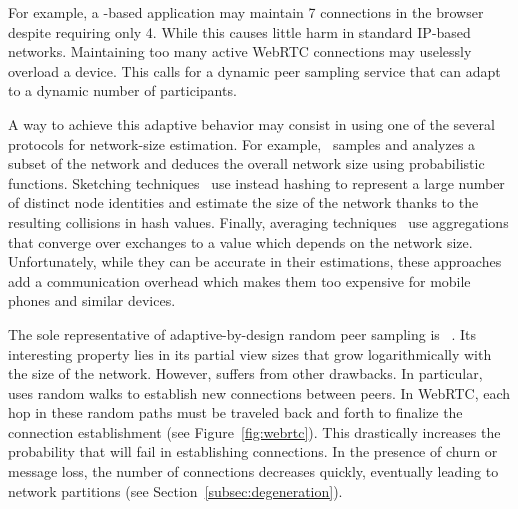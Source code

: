 For example, a \CYCLON-based application may maintain 7 connections in
the browser despite requiring only 4. While this causes little harm in
standard IP-based networks. Maintaining too many active WebRTC
connections may uselessly overload a device. This calls for a dynamic
peer sampling service that can adapt to a dynamic number of
participants.

A way to achieve this adaptive behavior may consist in using one of the several
protocols for network-size estimation. For example,~\cite{ganesh2007peer}
samples and analyzes a subset of the network and deduces the overall network
size using probabilistic functions.  Sketching
techniques~\cite{baquero2012extrema} use instead hashing to represent a large
number of distinct node identities and estimate the size of the network thanks
to the resulting collisions in hash values. Finally, averaging
techniques~\cite{jelasity2004epidemic} use aggregations that converge over
exchanges to a value which depends on the network size. Unfortunately, while
they can be accurate in their estimations, these approaches add a communication
overhead which makes them too expensive for mobile phones and similar devices.



The sole representative of adaptive-by-design random peer sampling is
\SCAMP~\cite{ganesh2001, ganesh2003peer}. Its interesting property lies in its
partial view sizes that grow logarithmically with the size of the
network. However, \SCAMP suffers from other drawbacks.  In particular, \SCAMP
uses random walks to establish new connections between peers. In WebRTC, each
hop in these random paths must be traveled back and forth to finalize the
connection establishment (see Figure~\ref{fig:webrtc}). This drastically
increases the probability that \SCAMP will fail in establishing connections. In
the presence of churn or message loss, the number of connections decreases
quickly, eventually leading to network partitions (see
Section~\ref{subsec:degeneration}).


